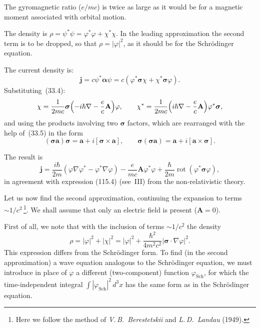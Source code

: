 The gyromagnetic ratio ($e/mc$) is twice as large as it would be for a magnetic moment associated with orbital motion.

The density is $\rho = \psi^*\psi = \varphi^*\varphi + \chi^*\chi$. In the leading approximation the second term is to be dropped, so that $\rho = |\varphi|^2$, as it should be for the Schr\"odinger equation.

The current density is:
\[
\mathbf{j} = c\psi^*\boldsymbol{\alpha}\psi = c(\varphi^*\boldsymbol{\sigma}\chi + \chi^*\boldsymbol{\sigma}\varphi).
\]
Substituting~(33.4):
\[
\chi = \frac{1}{2mc}\boldsymbol{\sigma}\Bigl(-i\hbar\nabla - \frac{e}{c}\mathbf{A}\Bigr)\varphi,\qquad \chi^* = \frac{1}{2mc}\Bigl(i\hbar\nabla - \frac{e}{c}\mathbf{A}\Bigr)\varphi^*\boldsymbol{\sigma},
\]
and using the products involving two $\boldsymbol{\sigma}$ factors, which are rearranged with the help of~(33.5) in the form
\begin{equation}
(\boldsymbol{\sigma}\mathbf{a})\boldsymbol{\sigma} = \mathbf{a} + i[\boldsymbol{\sigma}\times\mathbf{a}],\qquad \boldsymbol{\sigma}(\boldsymbol{\sigma}\mathbf{a}) = \mathbf{a} + i[\mathbf{a}\times\boldsymbol{\sigma}].
\tag{33.9}
\end{equation}

The result is
\begin{equation}
\mathbf{j} = \frac{i\hbar}{2m}(\varphi\nabla\varphi^* - \varphi^*\nabla\varphi) - \frac{e}{mc}\mathbf{A}\varphi^*\varphi + \frac{\hbar}{2m}\operatorname{rot}(\varphi^*\boldsymbol{\sigma}\varphi),
\tag{33.10}
\end{equation}
in agreement with expression (115.4) (see~III) from the non-relativistic theory.

Let us now find the second approximation, continuing the expansion to terms $\sim 1/c^2$\,\footnote{Here we follow the method of \emph{V.\,B.~Berestetskii} and \emph{L.\,D.~Landau} (1949).}. We shall assume that only an electric field is present ($\mathbf{A} = 0$).

First of all, we note that with the inclusion of terms $\sim 1/c^2$ the density
\[
\rho = |\varphi|^2 + |\chi|^2 = |\varphi|^2 + \frac{\hbar^2}{4m^2c^2}|\boldsymbol{\sigma}\cdot\nabla\varphi|^2.
\]
This expression differs from the Schr\"odinger form. To find (in the second approximation) a wave equation analogous to the Schr\"odinger equation, we must introduce in place of $\varphi$ a different (two-component) function $\varphi_{\text{Sch}}$, for which the time-independent integral $\int|\varphi_{\text{Sch}}|^2\,d^3x$ has the same form as in the Schr\"odinger equation.

